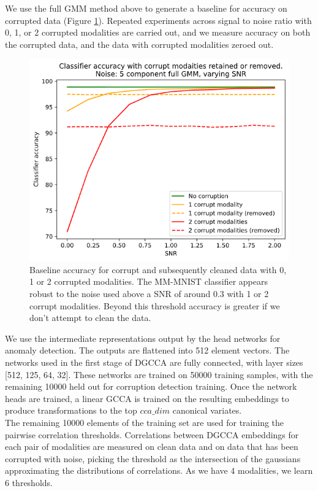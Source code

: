 We use the full GMM method above to generate a baseline for accuracy on corrupted data (Figure \ref{fig:baseline}). Repeated experiments across signal to noise ratio with 0, 1, or 2 corrupted modalities are carried out, and we measure accuracy on both the corrupted data, and the data with corrupted modalities zeroed out.

\begin{figure}[H]
    \centering\captionsetup{width=.8\linewidth}
    \includegraphics[width=.6\textwidth]{images/classifier_baseline.png}
    \caption{Baseline accuracy for corrupt and subsequently cleaned data with 0, 1 or 2 corrupted modalities. The MM-MNIST classifier appears robust to the noise used above a SNR of around 0.3 with 1 or 2 corrupt modalities. Beyond this threshold accuracy is greater if we don't attempt to clean the data.}
    \label{fig:baseline}
\end{figure}



We use the intermediate representations output by the head networks for anomaly detection. The outputs are flattened into 512 element vectors. The networks used in the first stage of DGCCA are fully connected, with layer sizes [512, 125, 64, 32]. These networks are trained on 50000 training samples, with the remaining 10000 held out for corruption detection training. Once the network heads are trained, a linear GCCA is trained on the resulting embeddings to produce transformations to the top $cca\_dim$ canonical variates.\\

The remaining 10000 elements of the training set are used for training the pairwise correlation thresholds. Correlations between DGCCA embeddings for each pair of modalities are measured on clean data and on data that has been corrupted with noise, picking the threshold as the intersection of the gaussians approximating the distributions of correlations. As we have 4 modalities, we learn 6 thresholds.\\


